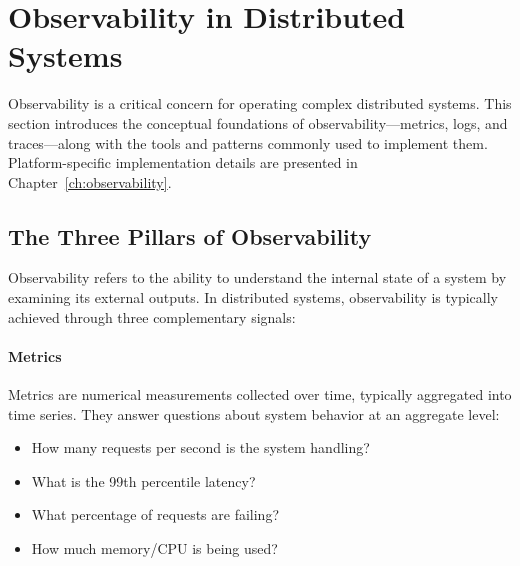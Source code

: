 %
%

\section{Observability in Distributed Systems}
\label{sec:observability-background}

Observability is a critical concern for operating complex distributed systems. This section introduces the conceptual foundations of observability---metrics, logs, and traces---along with the tools and patterns commonly used to implement them. Platform-specific implementation details are presented in Chapter~\ref{ch:observability}.

\subsection{The Three Pillars of Observability}

Observability refers to the ability to understand the internal state of a system by examining its external outputs. In distributed systems, observability is typically achieved through three complementary signals:

\paragraph{Metrics}

Metrics are numerical measurements collected over time, typically aggregated into time series. They answer questions about system behavior at an aggregate level:

\begin{itemize}
    \item How many requests per second is the system handling?
    \item What is the 99th percentile latency?
    \item What percentage of requests are failing?
    \item How much memory/CPU is being used?
\end{itemize}

